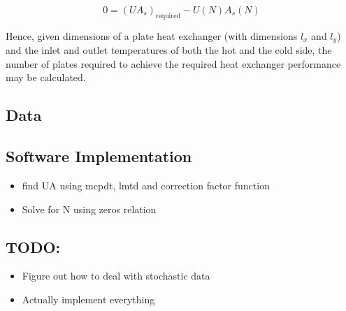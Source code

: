 \documentclass[12pt,letterpaper]{article}
\begin{document}
\begin{equation}
\label{eq:zeros}
0 = (UA_s)_{\textrm{required}} - U(N) A_s(N)
\end{equation}

Hence, given dimensions of a plate heat exchanger (with dimensions \(l_x\) and \(l_y\)) and the inlet and outlet temperatures of both the hot and the cold side, the number of plates required to achieve the required heat exchanger performance may be calculated.

\subsection{Data}

\subsection{Software Implementation}

\begin{itemize}
\item find UA using mcpdt, lmtd and correction factor function
\item Solve for N using zeros relation
\end{itemize}

\subsection{TODO:}
\begin{itemize}
\item Figure out how to deal with stochastic data
\item Actually implement everything
\end{itemize}
\end{document}
